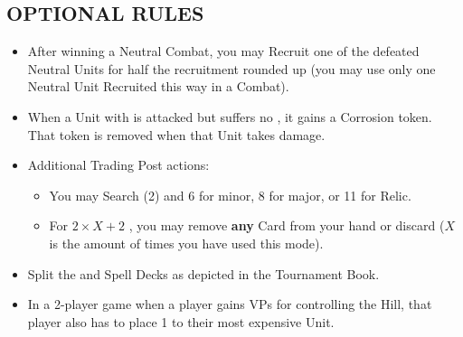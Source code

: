 \begin{multicols}{2}
\subsection*{\MakeUppercase{Optional Rules}}
\begin{itemize}
  \item After winning a Neutral Combat, you may Recruit one of the defeated Neutral Units for half the recruitment  rounded up (you may use only one Neutral Unit Recruited this way in a Combat).  %
  \item When a Unit with  is attacked but suffers no , it gains a Corrosion token. That token is removed when that Unit takes damage.
  \item Additional Trading Post actions:
  \begin{itemize}
    \item You may Search (2)  and  6  for minor, 8  for major, or 11  for Relic.
    \item For $2×X+2$ , you may remove \textbf{any} Card from your hand or discard ($X$is the amount of times you have used this mode).
  \end{itemize}
  \item Split the  and Spell Decks as depicted in the Tournament Book.
  \item In a 2-player game when a player gains VPs for controlling the Hill, that player also has to place 1  to their most expensive Unit.
\end{itemize}

\end{multicols}

